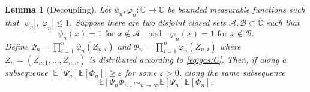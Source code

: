 \documentclass[10pt,reqno]{amsart}
\numberwithin{equation}{section}
\numberwithin{figure}{section}
\theoremstyle{plain}
\newtheorem{lemma}[theorem]{Lemma}
\newcommand{\<}{\langle}
\renewcommand{\>}{\rangle}
\begin{document}
\begin{lemma}[Decoupling] \label{lem:Independence}
	Let $\psi_n, \varphi_n : \overline{\mathbb C} \to \mathbb C$ be
	bounded measurable functions such that $|\psi_n|,|\varphi_n|\leq1$. Suppose there are
	two disjoint closed sets
	$\mathcal{A}, \mathcal{B}\subset \overline{\mathbb C}$ such that
	\begin{equation}
	    \psi_n(x) = 1 \mbox{ for } x \notin \mathcal{A} 
        \quad\text{and}\quad 
    	\varphi_n(x) = 1 \mbox{ for } x \notin  \mathcal{B}.
    \end{equation}
	Define
	$\Psi_n = \prod_{i=1}^n \psi_n(Z_{n,i})$ and
	$\Phi_n = \prod_{i=1}^n \varphi_n(Z_{n,i})$ where $Z_n=(Z_{n,1},\ldots,Z_{n,n})$ is distributed according to \eqref{eq:gas:C}.
	Then, if along a subsequence
    $|\mathbb E[\Psi_{n}]
	\mathbb E[\Phi_{n}]| \geq \varepsilon$
    for some $\varepsilon > 0$, along the same
    subsequence
	\begin{equation}
		\label{eq:indep}
		 \mathbb E[\Psi_{n} \Phi_{n}] 
         \sim_{n \to \infty} \mathbb E[\Psi_n]
	       \mathbb E[\Phi_n].
	\end{equation}
\end{lemma}
\end{document}
